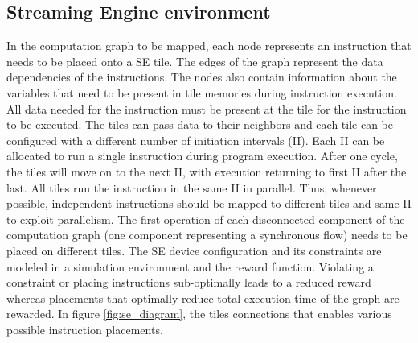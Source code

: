 

\subsection{Streaming Engine environment}


In the computation graph to be mapped, each node represents an instruction that needs to be placed onto a SE tile. 
The edges of the graph represent the data dependencies of the instructions. 
The nodes also contain information about the variables that need to be present in tile memories during instruction execution. 
All data needed for the instruction must be present at the tile for the instruction to be executed. 
The tiles can pass data to their neighbors and each tile can be configured with a different number of initiation intervals (II). 
Each II can be allocated to run a single instruction during program execution. 
After one cycle, the tiles will move on to the next II, with execution returning to first II after the last. 
All tiles run the instruction in the same II in parallel. 
Thus, whenever possible, independent instructions should be mapped to different tiles and same II to exploit parallelism. 
The first operation of each disconnected component of the computation graph (one component representing a synchronous flow) 
needs to be placed on different tiles. 
The SE device configuration and its constraints are modeled in a simulation environment and the reward function. 
Violating a constraint or placing instructions sub-optimally leads to a reduced reward whereas placements that optimally 
reduce total execution time of the graph are rewarded. 
In figure \ref{fig:se_diagram}, the tiles connections that enables various possible instruction placements.

